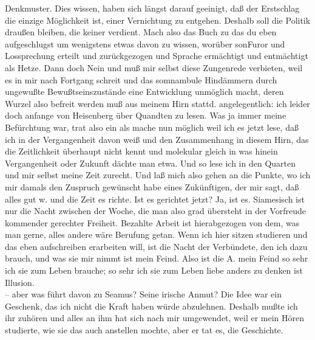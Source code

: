 \documentclass[
]{article}
\begin{document}
Denkmuster. Dies wissen, haben sich längst darauf geeinigt, daß der
Erstschlag die einzige Möglichkeit ist, einer Vernichtung zu entgehen.
Deshalb soll die Politik draußen bleiben, die keiner verdient. Mach also
das Buch zu das du eben aufgeschlugst um wenigstens etwas davon zu
wissen, worüber sonFuror und Lossprechung erteilt und zurückgezogen und
Sprache ermächtigt und entmächtigt als Hetze. Dann doch Nein und muß mir
selbst diese Zungenrede verbieten, weil es in mir nach Fortgang schreit
und das somnambule Hindämmern durch ungewußte Bewußtseinszustände eine
Entwicklung unmöglich macht, deren Wurzel also befreit werden muß aus
meinem Hirn stattd. angelegentlich: ich leider doch anfange von
Heisenberg über Quandten zu lesen. Was ja immer meine Befürchtung war,
trat also ein als mache nun möglich weil ich es jetzt lese, daß ich in
der Vergangenheit davon weiß und den Zusammenhang in diesem Hirn, das
die Zeitlichkeit überhaupt nicht kennt und molekular gleich in was
hinein Vergangenheit oder Zukunft dächte man etwa. Und so lese ich in
den Quarten und mir selbst meine Zeit zurecht. Und laß mich also gehen
an die Punkte, wo ich mir damals den Zuspruch gewünscht habe eines
Zukünftigen, der mir sagt, daß alles gut w. und die Zeit es richte. Ist
es gerichtet jetzt? Ja, ist es. Siamesisch ist nur die Nacht zwischen
der Woche, die man also grad übersteht in der Vorfreude kommender
gerechter Freiheit. Bezahlte Arbeit ist hierabgezogen von dem, was man
gerne, alles andere wäre Berufung getan. Wenn ich hier sitzen studieren
und das eben aufschreiben erarbeiten will, ist die Nacht der Verbündete,
den ich dazu brauch, und was sie mir nimmt ist mein Feind. Also ist die
A. mein Feind so sehr ich sie zum Leben brauche; so sehr ich sie zum
Leben liebe anders zu denken ist Illusion.\\
-- aber was führt davon zu Seamus? Seine irische Anmut? Die Idee war ein
Geschenk, das ich nicht die Kraft haben würde abzulehnen. Deshalb mußte
ich ihr zuhören und alles an ihm hat sich nach mir umgewendet, weil er
mein Hören studierte, wie sie das auch anstellen mochte, aber er tat es,
die Geschichte.
\end{document}
